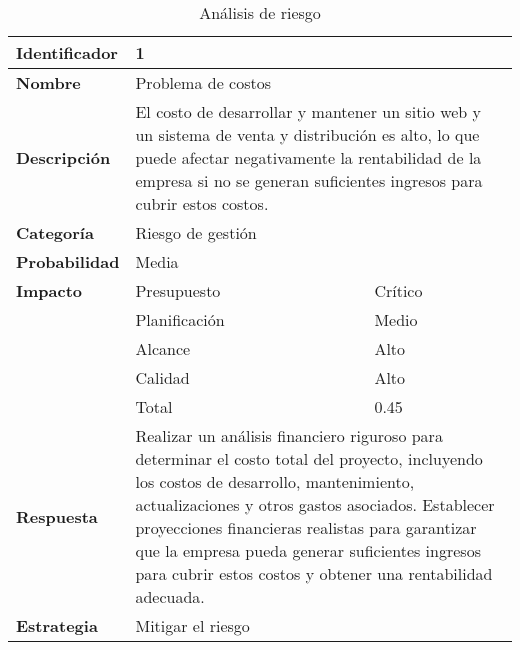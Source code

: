 \begin{table}[htb]
    \centering
    \caption{Análisis de riesgo}
    \label{table:risk_analysis}
    \begin{tabular}{>{\columncolor{rowcolor}}l l l}
    \toprule
    \rowcolor{lightgreen}
    \textbf{Identificador} & \multicolumn{2}{l}{1} \\
    \midrule
    \textbf{Nombre} & \multicolumn{2}{l}{Problema de costos} \\
    \midrule
    \textbf{Descripción} & \multicolumn{2}{p{10cm}}{El costo de desarrollar y mantener un sitio web y un sistema de venta y distribución es alto, lo que puede afectar negativamente la rentabilidad de la empresa si no se generan suficientes ingresos para cubrir estos costos.} \\
    \midrule
    \textbf{Categoría} & \multicolumn{2}{l}{Riesgo de gestión} \\
    \midrule
    \textbf{Probabilidad} & \multicolumn{2}{l}{Media} \\
    \midrule
    \textbf{Impacto} & Presupuesto & Crítico \\
    \cmidrule(lr){2-3}
    & Planificación & Medio \\
    \cmidrule(lr){2-3}
    & Alcance & Alto \\
    \cmidrule(lr){2-3}
    & Calidad & Alto \\
    \cmidrule(lr){2-3}
    & Total & 0.45 \\
    \midrule
    \textbf{Respuesta} & \multicolumn{2}{p{10cm}}{Realizar un análisis financiero riguroso para determinar el costo total del proyecto, incluyendo los costos de desarrollo, mantenimiento, actualizaciones y otros gastos asociados. Establecer proyecciones financieras realistas para garantizar que la empresa pueda generar suficientes ingresos para cubrir estos costos y obtener una rentabilidad adecuada.} \\
    \midrule
    \textbf{Estrategia} & \multicolumn{2}{l}{Mitigar el riesgo} \\
    \bottomrule
    \end{tabular}
    \end{table}
